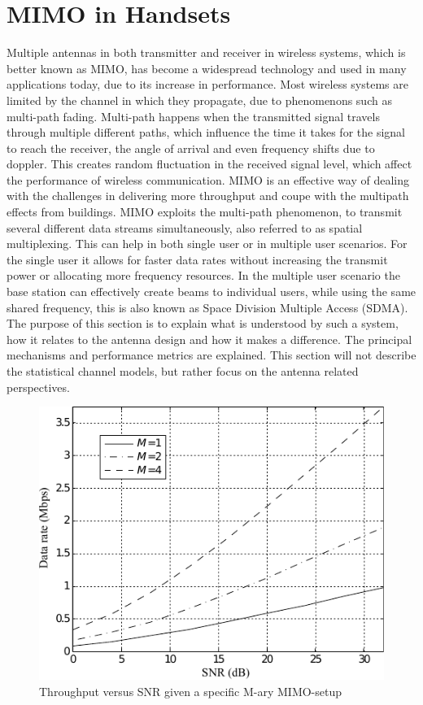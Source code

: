 \section{MIMO in Handsets}
\label{sec:mimo_in_handsets}
Multiple antennas in both transmitter and receiver in wireless systems, which is better known as MIMO, has become a widespread technology and used in many applications today, due to its increase in performance. Most wireless systems are limited by the channel in which they propagate, due to phenomenons such as multi-path fading. Multi-path happens when the transmitted signal travels through multiple different paths, which influence the time it takes for the signal to reach the receiver, the angle of arrival and even frequency shifts due to doppler. This creates random fluctuation in the received signal level, which affect the performance of wireless communication.  MIMO is an effective way of dealing with the challenges in delivering more throughput and coupe with the multipath effects from buildings. MIMO exploits the multi-path phenomenon, to transmit several different data streams simultaneously, also referred to as spatial multiplexing. This can help in both single user or in multiple user scenarios. For the single user it allows for faster data rates without increasing the transmit power or allocating more frequency resources. In the multiple user scenario the base station can effectively create beams to individual users, while using the same shared frequency, this is also known as Space Division Multiple Access (SDMA). The purpose of this section is to explain what is understood by such a system, how it relates to the antenna design and how it makes a difference. The principal mechanisms and performance metrics are explained. This section will not describe the statistical channel models, but rather focus on the antenna related perspectives. 

\begin{figure}[htbp]
  \centering
  \includegraphics[scale=1.2]{img/analysis/datarateMimo}
  \caption{Throughput versus SNR given a specific M-ary MIMO-setup\cite{Ezio2007MIMO}}
  \label{fig:mimo-throughput}
\end{figure}

